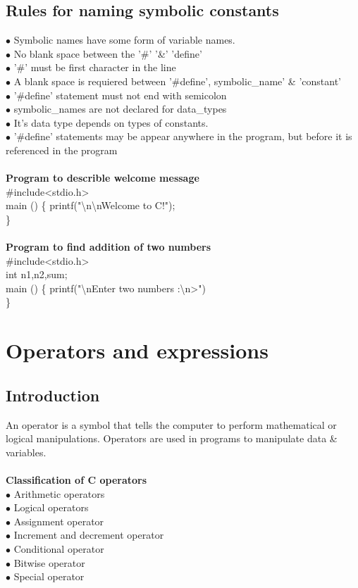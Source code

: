 \documentclass{article}
\begin{document}
	\subsection{Rules for naming symbolic constants}
	$\bullet$ Symbolic names have some form of variable names. \\
	$\bullet$ No blank space between the '\#' '\&' 'define' \\
	$\bullet$ '\#' must be first character in the line \\
	$\bullet$ A blank space is requiered between '\#define', symbolic\_name' \& 'constant' \\
	$\bullet$ '\#define' statement must not end with semicolon \\
	$\bullet$ symbolic\_names are not declared for data\_types \\
	$\bullet$ It's data type depends on types of constants. \\
	$\bullet$ '\#define' statements may be appear anywhere in the program, but before it is referenced in the program
	\\ \\
	\textbf{Program to describle welcome message} \\
	{
		\code
		\#include<stdio.h> \\
		main () \{
		\tabto{0.5cm} printf("\textbackslash n\textbackslash nWelcome to C!");\\
		\}
	} \\ \\
	\textbf{Program to find addition of two numbers} \\
	{ \code
		\#include<stdio.h> \\
		int n1,n2,sum; \\
		main () \{
		\tabto{0.5cm} printf("\textbackslash nEnter two numbers :\textbackslash n>")\\
		\}
	}

	\section{Operators and expressions}
	\subsection{Introduction}
	An operator is a symbol that  tells the computer to perform mathematical or logical manipulations. Operators are used in programs to manipulate data \& variables.
	\\ \\
	\textbf{Classification of C operators} \\
	$\bullet$ Arithmetic operators \\
	$\bullet$ Logical operators \\
	$\bullet$ Assignment operator \\
	$\bullet$ Increment and decrement operator \\
	$\bullet$ Conditional operator \\
	$\bullet$ Bitwise operator \\
	$\bullet$ Special operator
	
\end{document}
